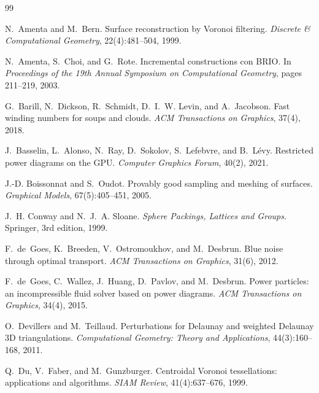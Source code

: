 \documentclass[11pt,a4paper]{article}
\begin{document}
\begin{thebibliography}{99}
\small

N.~Amenta and M.~Bern.
\newblock Surface reconstruction by {V}oronoi filtering.
\newblock \emph{Discrete \& Computational Geometry}, 22(4):481--504, 1999.

N.~Amenta, S.~Choi, and G.~Rote.
\newblock Incremental constructions con {BRIO}.
\newblock In \emph{Proceedings of the 19th Annual Symposium on Computational Geometry}, pages
  211--219, 2003.

G.~Barill, N.~Dickson, R.~Schmidt, D.~I.~W. Levin, and A.~Jacobson.
\newblock Fast winding numbers for soups and clouds.
\newblock \emph{ACM Transactions on Graphics}, 37(4), 2018.

J.~Basselin, L.~Alonso, N.~Ray, D.~Sokolov, S.~Lefebvre, and B.~Lévy.
\newblock Restricted power diagrams on the {GPU}.
\newblock \emph{Computer Graphics Forum}, 40(2), 2021.

J.-D. Boissonnat and S.~Oudot.
\newblock Provably good sampling and meshing of surfaces.
\newblock \emph{Graphical Models}, 67(5):405--451, 2005.

J.~H. Conway and N.~J.~A. Sloane.
\newblock \emph{Sphere Packings, Lattices and Groups}.
\newblock Springer, 3rd edition, 1999.

F.~de~Goes, K.~Breeden, V.~Ostromoukhov, and M.~Desbrun.
\newblock Blue noise through optimal transport.
\newblock \emph{ACM Transactions on Graphics}, 31(6), 2012.

F.~de~Goes, C.~Wallez, J.~Huang, D.~Pavlov, and M.~Desbrun.
\newblock Power particles: an incompressible fluid solver based on power diagrams.
\newblock \emph{ACM Transactions on Graphics}, 34(4), 2015.

O.~Devillers and M.~Teillaud.
\newblock Perturbations for {D}elaunay and weighted {D}elaunay 3{D} triangulations.
\newblock \emph{Computational Geometry: Theory and Applications}, 44(3):160--168, 2011.

Q.~Du, V.~Faber, and M.~Gunzburger.
\newblock Centroidal {V}oronoi tessellations: applications and algorithms.
\newblock \emph{SIAM Review}, 41(4):637--676, 1999.


\end{thebibliography}
\end{document}
